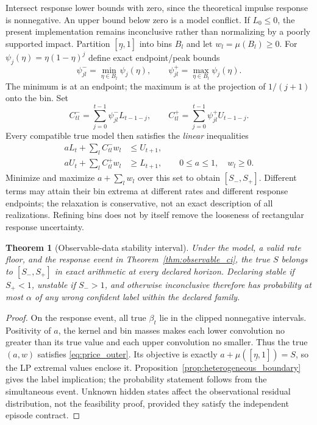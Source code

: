 \documentclass[10pt,twocolumn,letterpaper]{article}
\newtheorem{theorem}{Theorem}[section]
\theoremstyle{definition}
\theoremstyle{remark}
\begin{document}
Intersect response lower bounds with zero, since the theoretical impulse response is nonnegative. An upper bound below zero is a model conflict. If $L_0\le0$, the present implementation remains inconclusive rather than normalizing by a poorly supported impact. Partition $[\underline\eta,1]$ into bins $B_l$ and let $w_l=\mu(B_l)\ge0$. For $\psi_j(\eta)=\eta(1-\eta)^j$ define exact endpoint/peak bounds
\[
 \psi_{jl}^-=\min_{\eta\in B_l}\psi_j(\eta),\qquad
 \psi_{jl}^+=\max_{\eta\in B_l}\psi_j(\eta).
\]
The minimum is at an endpoint; the maximum is at the projection of $1/(j+1)$ onto the bin. Set
\begin{equation}
 C_{tl}^-=\sum_{j=0}^{t-1}\psi_{jl}^-L_{t-1-j},\qquad
 C_{tl}^+=\sum_{j=0}^{t-1}\psi_{jl}^+U_{t-1-j}.
\end{equation}
Every compatible true model then satisfies the \emph{linear} inequalities
\begin{align}
 aL_t+\sum_l C_{tl}^-w_l&\le U_{t+1},\\
 aU_t+\sum_l C_{tl}^+w_l&\ge L_{t+1},\qquad 0\le a\le1,
 \quad w_l\ge0.
 \label{eq:price_outer}
\end{align}
Minimize and maximize $a+\sum_lw_l$ over this set to obtain $[S_-,S_+]$. Different terms may attain their bin extrema at different rates and different response endpoints; the relaxation is conservative, not an exact description of all realizations. Refining bins does not by itself remove the looseness of rectangular response uncertainty.

\begin{theorem}[Observable-data stability interval]
\label{thm:observable_stability}
Under the model, a valid rate floor, and the response event in Theorem~\ref{thm:observable_ci}, the true $S$ belongs to $[S_-,S_+]$ in exact arithmetic at every declared horizon. Declaring stable if $S_+<1$, unstable if $S_->1$, and otherwise inconclusive therefore has probability at most $\alpha$ of any wrong confident label within the declared family.
\end{theorem}
\begin{proof}
On the response event, all true $\beta_t$ lie in the clipped nonnegative intervals. Positivity of $a$, the kernel and bin masses makes each lower convolution no greater than its true value and each upper convolution no smaller. Thus the true $(a,w)$ satisfies \eqref{eq:price_outer}. Its objective is exactly $a+\mu([\underline\eta,1])=S$, so the LP extremal values enclose it. Proposition~\ref{prop:heterogeneous_boundary} gives the label implication; the probability statement follows from the simultaneous event. Unknown hidden states affect the observational residual distribution, not the feasibility proof, provided they satisfy the independent episode contract.
\end{proof}
\end{document}
